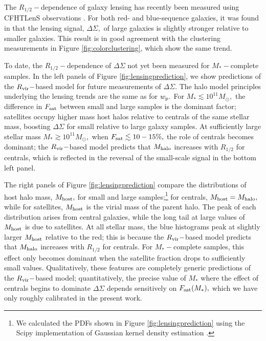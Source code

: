 \documentclass[usenatbib,usegraphicx,letterpaper]{mn2e}
\newcommand{\rhalf}{R_{1/2}}
\newcommand{\mstar}{M_{\ast}}
\newcommand{\mhalo}{M_{\rm halo}}
\newcommand{\mhost}{M_{\rm host}}
\newcommand{\rvir}{R_{\rm vir}}
\newcommand{\wproj}{w_{\rm p}}
\newcommand{\msun}{M_\odot}
\begin{document}
The $\rhalf-$dependence of galaxy lensing has recently been measured using CFHTLenS observations \citep{heymans_etal12,erben_etal13}. For both red- and blue-sequence galaxies, it was found in \citet{charlton_etal17} that the lensing signal, $\Delta\Sigma,$ of large galaxies is slightly stronger relative to smaller galaxies. This result is in good agreement with the clustering measurements in Figure \ref{fig:colorclustering}, which show the same trend. 

To date, the $\rhalf-$dependence of $\Delta\Sigma$ not yet been measured for $\mstar-$complete samples. In the left panels of Figure \ref{fig:lensingprediction}, we show predictions of the $\rvir-$based model for future measurements of $\Delta\Sigma.$ The halo model principles underlying the lensing trends are the same as for $\wproj.$ For $\mstar\lesssim10^{11}\msun,$ the difference in $F_{\rm sat}$ between small and large samples is the dominant factor; satellites occupy higher mass host halos relative to centrals of the same stellar mass, boosting $\Delta\Sigma$ for small relative to large galaxy samples. At sufficiently large stellar mass $\mstar\gtrsim10^{11}\msun,$ when $F_{\rm sat}\lesssim10-15\%,$ the role of centrals becomes dominant; the $\rvir-$based model predicts that $\mhalo$ increases with $\rhalf$ for centrals, which is reflected in the reversal of the small-scale signal in the bottom left panel. 

The right panels of Figure \ref{fig:lensingprediction} compare the distributions of host halo mass, $\mhost,$ for small and large samples;\footnote{We calculated the PDFs shown in Figure \ref{fig:lensingprediction} using the Scipy implementation of Gaussian kernel density estimation \citep{scipy}.} for centrals, $\mhost=\mhalo,$ while for satellites, $\mhost$ is the virial mass of the parent halo. The peak of each distribution arises from central galaxies, while the long tail at large values of $\mhost$ is due to satellites. At all stellar mass, the blue histograms peak at slightly larger $\mhost$ relative to the red; this is because the $\rvir-$based model predicts that $\mhalo$ increases with $\rhalf$ for centrals. For $\mstar-$complete samples, this effect only becomes dominant when the satellite fraction drops to sufficiently small values. Qualitatively, these features are completely generic predictions of the $\rvir-$based model; quantitatively, the precise value of $\mstar$ where the effect of centrals begins to dominate $\Delta\Sigma$ depends sensitively on $F_{\rm sat}(\mstar),$ which we have only roughly calibrated in the present work. 
\end{document}
